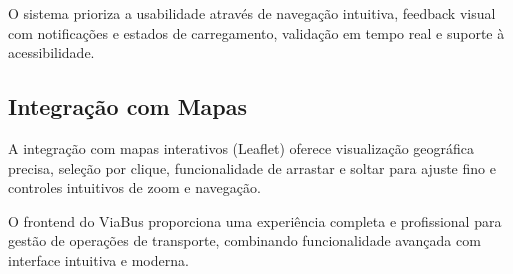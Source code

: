 O sistema prioriza a usabilidade através de navegação intuitiva, feedback visual com notificações e estados de carregamento, validação em tempo real e suporte à acessibilidade.

\subsection{Integração com Mapas}

A integração com mapas interativos (Leaflet) oferece visualização geográfica precisa, seleção por clique, funcionalidade de arrastar e soltar para ajuste fino e controles intuitivos de zoom e navegação.

O frontend do ViaBus proporciona uma experiência completa e profissional para gestão de operações de transporte, combinando funcionalidade avançada com interface intuitiva e moderna.

